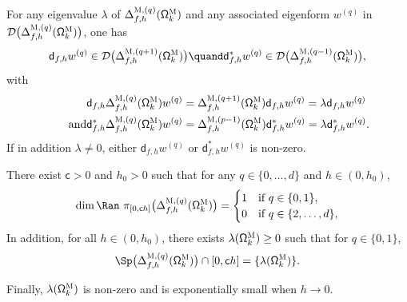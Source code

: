\begin{proposition}
\begin{enumeratei}
\item\label{pr.DeltaTNii}
For any eigenvalue $\lambda$ of $\Delta_{f,h}^{\textsc{M}, (q)} (\mathsf \Omega_k^{\textsc{M}})$
and any associated eigenform $w_{}^{(q)}$ in $\mathcal D\bigl(\Delta_{f,h}^{\textsc{M}, (q)} (\mathsf \Omega_k^{\textsc{M}})\bigr)$, one has\vspace*{-3pt}
\[
\mathsf d_{f,h}w_{}^{(q)}\in\mathcal D\bigl(\Delta_{f,h}^{\textsc{M},(q+1)}(\mathsf \Omega_k^{\textsc{M}}) \bigr)
\quand
\mathsf d^{*}_{f,h}w_{}^{(q)}\in \mathcal D\bigl(\Delta_{f,h}^{\textsc{M},(q-1)}(\mathsf \Omega_k^{\textsc{M}}) \bigr),
\]
with\vspace*{-7pt}
\begin{align*}
\mathsf d_{f,h}\Delta_{f,h}^{\textsc{M}, (q)}(\mathsf
\Omega_k^{\textsc{M}}) w_{}^{(q)}&=
\Delta_{f,h}^{\textsc{M}, (q+1)}(\mathsf \Omega_k^{\textsc{M}})\mathsf d_{f,h}w_{}^{(q)}
= \lambda \mathsf d_{f,h}w_{}^{(q)}
\\
\tag*{and}
\mathsf d^*_{f,h}\Delta_{f,h}^{\textsc{M},(q)} (\mathsf \Omega_k^{\textsc{M}})w_{}^{(q)}&=
\Delta_{f,h}^{\textsc{M},(p-1)} (\mathsf \Omega_k^{\textsc{M}})\mathsf d^*_{f,h}w_{}^{(q)}
= \lambda\mathsf d^*_{f,h}w_{}^{(q)}.
\end{align*}
If in addition $\lambda\neq 0$, either $\mathsf d_{f,h}w_{}^{(q)}$ or $\mathsf d^*_{f,h}w_{}^{(q)}$ is non-zero.
\item\label{pr.DeltaTNiii}
There exist $\mathsf c>0$ and $h_0>0$ such that for any $q\in\{0,\dots,d\}$ and $h\in (0,h_0)$,\vspace*{-3pt}
\[
\dim\Ran \ \pi_{[0,\mathsf ch ]}\bigl(\Delta_{f,h}^{\textsc{M},(q)} (\mathsf \Omega_k^{\textsc{M}})\bigr)
=\begin{cases}
1 &\text{if}\ q\in\{0,1\},\\
0 &\text{if} \ q\in\{2,\ldots,d\},
\end{cases}
\]
In addition, for all $h\in (0,h_0)$, there exists $\lambda(\mathsf \Omega_k^{\textsc{M}})\ge 0$ such that for $q\in \{0,1\}$,\vspace*{-3pt}
\[
\Sp \bigl(\Delta_{f,h}^{\textsc{M},(q)} (\mathsf \Omega_k^{\textsc{M}})\bigr)\cap [0,\mathsf ch ]
=
\{ \lambda(\mathsf \Omega_k^{\textsc{M}})\}.
\]
\end{enumeratei}
Finally, $\lambda(\mathsf \Omega_k^{\textsc{M}})$ is non-zero and is exponentially small when $h\to 0$.
\end{proposition}

